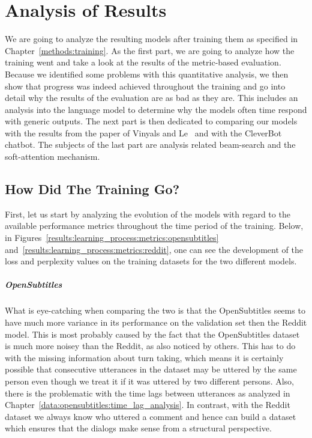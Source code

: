 \chapter{Analysis of Results}
We are going to analyze the resulting models after training them as specified in Chapter~\ref{methods:training}. As the first part, we are going to analyze how the training went and take a look at the results of the metric-based evaluation. Because we identified some problems with this quantitative analysis, we then show that progress was indeed achieved throughout the training and go into detail why the results of the evaluation are as bad as they are. This includes an analysis into the language model to determine why the models often time respond with generic outputs. The next part is then dedicated to comparing our models with the results from the paper of Vinyals and Le~\cite{Vinyals:2015} and with the CleverBot chatbot. The subjects of the last part are analysis related beam-search and the soft-attention mechanism.

\section{How Did The Training Go?}
First, let us start by analyzing the evolution of the models with regard to the available performance metrics throughout the time period of the training. Below, in Figures~\ref{results:learning_process:metrics:opensubtitles} and~\ref{results:learning_process:metrics:reddit}, one can see the development of the loss and perplexity values on the training datasets for the two different models.

\paragraph{OpenSubtitles} What is eye-catching when comparing the two is that the OpenSubtitles seems to have much more variance in its performance on the validation set then the Reddit model. This is most probably caused by the fact that the OpenSubtitles dataset is much more noisey than the Reddit, as also noticed by others\cite{Vinyals:2015}. This has to do with the missing information about turn taking, which means it is certainly possible that consecutive utterances in the dataset may be uttered by the same person even though we treat it if it was uttered by two different persons. Also, there is the problematic with the time lags between utterances as analyzed in Chapter~\ref{data:opensubtitles:time_lag_analysis}. In contrast, with the Reddit dataset we always know who uttered a comment and hence can build a dataset which ensures that the dialogs make sense from a structural perspective.

